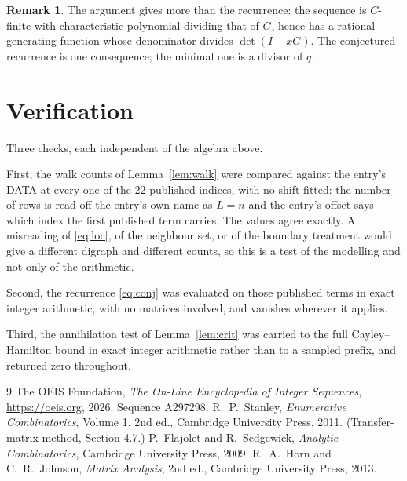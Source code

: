 \documentclass[11pt,a4paper]{article}
\theoremstyle{plain}
\theoremstyle{definition}
\newtheorem{remark}[theorem]{Remark}
\begin{document}
\begin{remark}
The argument gives more than the recurrence: the sequence is $C$-finite with characteristic
polynomial dividing that of $G$, hence has a rational generating function whose denominator
divides $\det(I-xG)$. The conjectured recurrence is one consequence; the minimal one is a
divisor of $q$.
\end{remark}

\section{Verification}

Three checks, each independent of the algebra above.

First, the walk counts of Lemma~\ref{lem:walk} were compared against the entry's DATA at
every one of the $22$ published indices, with no shift fitted: the number of rows is
read off the entry's own name as $L=n$ and the entry's offset says which index the first
published term carries. The values agree exactly. A misreading of \eqref{eq:loc}, of the
neighbour set, or of the boundary treatment would give a different digraph and different
counts, so this is a test of the modelling and not only of the arithmetic.

Second, the recurrence \eqref{eq:conj} was evaluated on those published terms in exact
integer arithmetic, with no matrices involved, and vanishes wherever it applies.

Third, the annihilation test of Lemma~\ref{lem:crit} was carried to the full
Cayley--Hamilton bound in exact integer arithmetic rather than to a sampled prefix, and
returned zero throughout.

\begin{thebibliography}{9}
 The OEIS Foundation, \emph{The On-Line Encyclopedia of Integer
Sequences}, \url{https://oeis.org}, 2026. Sequence A297298.
 R.~P.~Stanley, \emph{Enumerative Combinatorics}, Volume 1, 2nd ed.,
Cambridge University Press, 2011. (Transfer-matrix method, Section 4.7.)
 P.~Flajolet and R.~Sedgewick, \emph{Analytic Combinatorics}, Cambridge
University Press, 2009.
 R.~A.~Horn and C.~R.~Johnson, \emph{Matrix Analysis}, 2nd ed., Cambridge
University Press, 2013.
\end{thebibliography}
\end{document}
